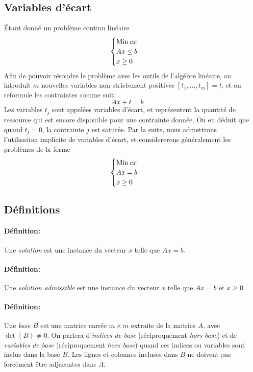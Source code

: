 \documentclass[a4paper]{report}
\begin{document}
\subsection{Variables d'écart}
Étant donné un problème continu linéaire
\[\begin{cases}
\text{Min\;} cx \\
Ax \le b \\
x \ge 0
\end{cases}\]
Afin de pouvoir résoudre le problème avec les outils de l'algèbre linéaire, on
introduit \(m\) nouvelles variables non-strictement positives
\([t_1,\dots,t_m]=t\), et on reformule les contraintes comme suit:
\[Ax+t=b\]
Les variables \(t_j\) sont appelées variables d'écart, et représentent la
quantité de ressource qui est encore disponible pour une contrainte donnée.
On en déduit que quand \(t_j=0\), la contrainte \(j\) est saturée.
Par la suite, nous admettrons l'utilisation implicite de variables d'écart,
et considererons généralement les problèmes de la forme
\[\begin{cases}
\text{Min\;} cx \\
Ax = b \\
x \ge 0
\end{cases}\]

\subsection{Définitions}
\paragraph{Définition:}Une \emph{solution} est une instance du vecteur \(x\)
telle que \(Ax=b\).
\paragraph{Définition:}Une \emph{solution admissible} est une instance du
vecteur \(x\) telle que \(Ax=b\) et \(x \ge 0\).
\paragraph{Définition:}Une \emph{base} \(B\) est une matrice carrée \(m\times
m\) extraite de la matrice \(A\), avec \(\det(B)\ne 0\). On parlera
d'\emph{indices de base} (réciproquement \emph{hors base}) et de \emph{variables
de base} (réciproquement \emph{hors base}) quand ces indices ou variables sont
inclus dans la base \(B\). Les lignes et colonnes incluses dans \(B\) ne doivent
pas forcément être adjacentes dans \(A\).
\end{document}
